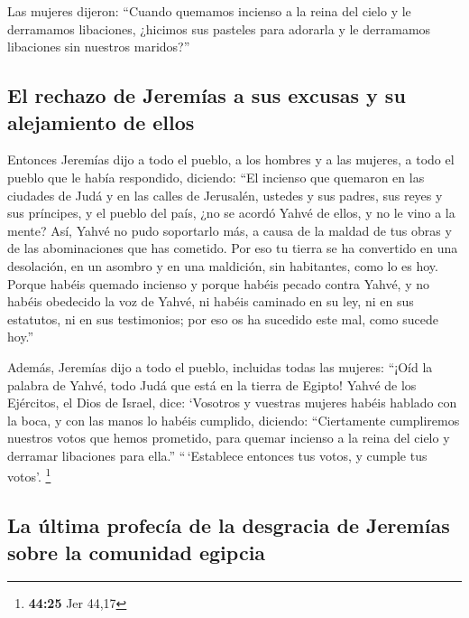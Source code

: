 \begin{paracol}{2}
 Las mujeres dijeron: ``Cuando quemamos incienso a la
reina del cielo y le derramamos libaciones, ¿hicimos sus pasteles para
adorarla y le derramamos libaciones sin nuestros maridos?''

\hypertarget{el-rechazo-de-jeremuxedas-a-sus-excusas-y-su-alejamiento-de-ellos}{%
\subsection{El rechazo de Jeremías a sus excusas y su alejamiento de
ellos}\label{el-rechazo-de-jeremuxedas-a-sus-excusas-y-su-alejamiento-de-ellos}}

 Entonces Jeremías dijo a todo el pueblo, a los hombres y
a las mujeres, a todo el pueblo que le había respondido, diciendo:
 ``El incienso que quemaron en las ciudades de Judá y en
las calles de Jerusalén, ustedes y sus padres, sus reyes y sus
príncipes, y el pueblo del país, ¿no se acordó Yahvé de ellos, y no le
vino a la mente?  Así, Yahvé no pudo soportarlo más, a
causa de la maldad de tus obras y de las abominaciones que has cometido.
Por eso tu tierra se ha convertido en una desolación, en un asombro y en
una maldición, sin habitantes, como lo es hoy.  Porque
habéis quemado incienso y porque habéis pecado contra Yahvé, y no habéis
obedecido la voz de Yahvé, ni habéis caminado en su ley, ni en sus
estatutos, ni en sus testimonios; por eso os ha sucedido este mal, como
sucede hoy.''

 Además, Jeremías dijo a todo el pueblo, incluidas todas
las mujeres: ``¡Oíd la palabra de Yahvé, todo Judá que está en la tierra
de Egipto!  Yahvé de los Ejércitos, el Dios de Israel,
dice: `Vosotros y vuestras mujeres habéis hablado con la boca, y con las
manos lo habéis cumplido, diciendo: ``Ciertamente cumpliremos nuestros
votos que hemos prometido, para quemar incienso a la reina del cielo y
derramar libaciones para ella.'' ``\,`Establece entonces tus votos, y
cumple tus votos'. \footnote{\textbf{44:25} Jer 44,17}

\hypertarget{la-uxfaltima-profecuxeda-de-la-desgracia-de-jeremuxedas-sobre-la-comunidad-egipcia}{%
\subsection{La última profecía de la desgracia de Jeremías sobre la
comunidad
egipcia}\label{la-uxfaltima-profecuxeda-de-la-desgracia-de-jeremuxedas-sobre-la-comunidad-egipcia}}


\end{paracol}
